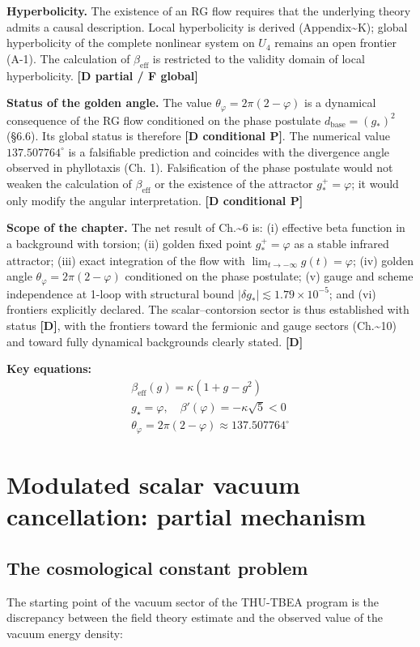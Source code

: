 ﻿\documentclass[11pt,letterpaper]{article}
\begin{document}
\textbf{Hyperbolicity.} The existence of an RG flow requires that the underlying theory admits a causal description. Local hyperbolicity is derived (Appendix\textasciitilde{}K); global hyperbolicity of the complete nonlinear system on $U_4$ remains an open frontier (A-1). The calculation of $\beta_{\text{eff}}$ is restricted to the validity domain of local hyperbolicity. \textbf{[D partial / F global]}

\textbf{Status of the golden angle.} The value $\theta_\varphi = 2\pi(2 - \varphi)$ is a dynamical consequence of the RG flow conditioned on the phase postulate $d_{\text{base}} = (g_*)^2$ (§6.6). Its global status is therefore \textbf{[D conditional P]}. The numerical value $137{.}507764^\circ$ is a falsifiable prediction and coincides with the divergence angle observed in phyllotaxis (Ch. 1). Falsification of the phase postulate would not weaken the calculation of $\beta_{\text{eff}}$ or the existence of the attractor $g_*^+ = \varphi$; it would only modify the angular interpretation. \textbf{[D conditional P]}

\textbf{Scope of the chapter.} The net result of Ch.\textasciitilde{}6 is: (i) effective beta function in a background with torsion; (ii) golden fixed point $g_*^+ = \varphi$ as a stable infrared attractor; (iii) exact integration of the flow with $\lim_{t \to -\infty} g(t) = \varphi$; (iv) golden angle $\theta_\varphi = 2\pi(2 - \varphi)$ conditioned on the phase postulate; (v) gauge and scheme independence at 1-loop with structural bound $|\delta g_*| \lesssim 1{.}79 \times 10^{-5}$; and (vi) frontiers explicitly declared. The scalar--contorsion sector is thus established with status \textbf{[D]}, with the frontiers toward the fermionic and gauge sectors (Ch.\textasciitilde{}10) and toward fully dynamical backgrounds clearly stated. \textbf{[D]}

\textbf{Key equations:}
\begin{align*}
    \beta_{\mathrm{eff}}(g) = \kappa(1+g-g^2) \\
    g_\star = \varphi, \quad \beta'(\varphi) = -\kappa\sqrt{5} < 0 \\
    \theta_\varphi = 2\pi(2-\varphi) \approx 137.507764^\circ
\end{align*}
\section{Modulated scalar vacuum cancellation: partial mechanism}
\subsection{The cosmological constant problem}
The starting point of the vacuum sector of the THU-TBEA program is the discrepancy between the field theory estimate and the observed value of the vacuum energy density:
\end{document}
